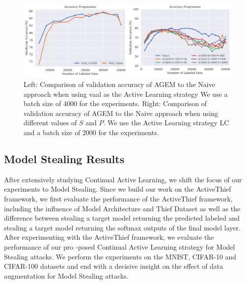 \begin{figure}[h]
    \centering
    \includegraphics[width=\linewidth]{images/results_CAL/AGEM_plots.png}
    \caption[Continual Active Learning Custom Replay strategy]{Left: Comparison of validation accuracy of AGEM to the Naive approach when using \gls{vaal} as the Active Learning strategy We use a batch size of 4000 for the experiments. Right: Comparison of validation accuracy of AGEM
     to the Naive approach when using different values of $S$ and $P$. We use the Active Learning strategy LC and a batch size of 2000 for the experiments.}
    \label{fig:Evaluation:Results:CAL:AGEM}
\end{figure}

\subsection{Model Stealing Results}
\label{sec:Evaluation:Results:MS}
After extensively studying Continual Active Learning, we shift the focus of our experiments to Model Stealing. Since we build our work on the ActiveThief framework, we first evaluate the performance of the ActiveThief framework, including the influence of Model Architecture and
Thief Dataset as well as the difference between stealing a target model returning the predicted labeled and stealing a target model returning the softmax outputs of the final model layer. After experimenting with the ActiveThief framework, we evaluate the performance of our pro
-posed Continual Active Learning strategy for Model Stealing attacks. We perform the experiments on the MNIST, CIFAR-10 and CIFAR-100 datasets and end with a decisive insight on the effect of data augmentation for Model Stealing attacks. \par


